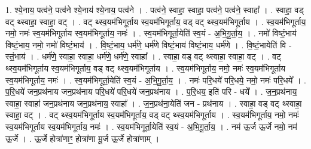 \documentclass[17pt]{extarticle}
\begin{document}
1. श्ये॒नाय॒ पत्व॑ने॒ पत्व॑ने श्ये॒नाय॑ श्ये॒नाय॒ पत्व॑ने । . पत्व॑ने॒ स्वाहा॒ स्वाहा॒ पत्व॑ने॒ पत्व॑ने॒ स्वाहा᳚ । . स्वाहा॒ वड् वट् थ्स्वाहा॒ स्वाहा॒ वट् । . वट् थ्स्व॒यम॑भिगूर्ताय स्व॒यम॑भिगूर्ताय॒ वड् वट् थ्स्व॒यम॑भिगूर्ताय । . स्व॒यम॑भिगूर्ताय॒ नमो॒ नमः॑ स्व॒यम॑भिगूर्ताय स्व॒यम॑भिगूर्ताय॒ नमः॑ । . स्व॒यम॑भिगूर्ता॒येति॑ स्व॒यं - अ॒भि॒गू॒र्ता॒य॒ । . नमो॑ विष्टं॒भाय॑ विष्टं॒भाय॒ नमो॒ नमो॑ विष्टं॒भाय॑ । . वि॒ष्टं॒भाय॒ धर्म॑णे॒ धर्म॑णे विष्टं॒भाय॑ विष्टं॒भाय॒ धर्म॑णे । . वि॒ष्टं॒भायेति॑ वि - स्तं॒भाय॑ । . धर्म॑णे॒ स्वाहा॒ स्वाहा॒ धर्म॑णे॒ धर्म॑णे॒ स्वाहा᳚ । . स्वाहा॒ वड् वट् थ्स्वाहा॒ स्वाहा॒ वट् । . वट् थ्स्व॒यम॑भिगूर्ताय स्व॒यम॑भिगूर्ताय॒ वड् वट् थ्स्व॒यम॑भिगूर्ताय । . स्व॒यम॑भिगूर्ताय॒ नमो॒ नमः॑ स्व॒यम॑भिगूर्ताय स्व॒यम॑भिगूर्ताय॒ नमः॑ । . स्व॒यम॑भिगूर्ता॒येति॑ स्व॒यं - अ॒भि॒गू॒र्ता॒य॒ । . नमः॑ परि॒धये॑ परि॒धये॒ नमो॒ नमः॑ परि॒धये᳚ । . प॒रि॒धये॑ जन॒प्रथ॑नाय जन॒प्रथ॑नाय परि॒धये॑ परि॒धये॑ जन॒प्रथ॑नाय । . प॒रि॒धय॒ इति॑ परि - धये᳚ । . ज॒न॒प्रथ॑नाय॒ स्वाहा॒ स्वाहा॑ जन॒प्रथ॑नाय जन॒प्रथ॑नाय॒ स्वाहा᳚ । . ज॒न॒प्रथ॑ना॒येति॑ जन - प्रथ॑नाय । . स्वाहा॒ वड् वट् थ्स्वाहा॒ स्वाहा॒ वट् । . वट् थ्स्व॒यम॑भिगूर्ताय स्व॒यम॑भिगूर्ताय॒ वड् वट् थ्स्व॒यम॑भिगूर्ताय । . स्व॒यम॑भिगूर्ताय॒ नमो॒ नमः॑ स्व॒यम॑भिगूर्ताय स्व॒यम॑भिगूर्ताय॒ नमः॑ । . स्व॒यम॑भिगूर्ता॒येति॑ स्व॒यं - अ॒भि॒गू॒र्ता॒य॒ । . नम॑ ऊ॒र्ज ऊ॒र्जे नमो॒ नम॑ ऊ॒र्जे । . ऊ॒र्जे होत्रा॑णाꣳ॒॒ होत्रा॑णा मू॒र्ज ऊ॒र्जे होत्रा॑णाम् । \newline
\end{document}
